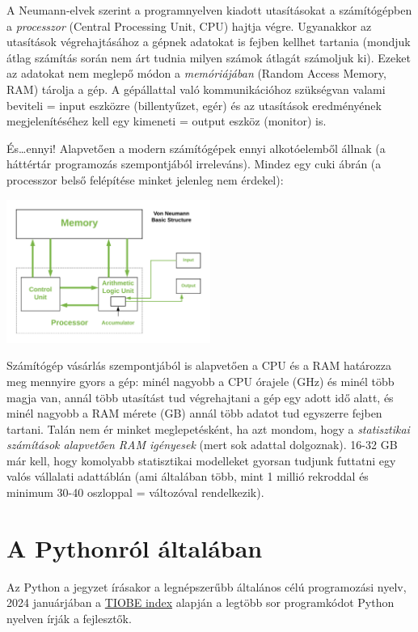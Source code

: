\documentclass[
]{book}
\begin{document}
A Neumann-elvek szerint a programnyelven kiadott utasításokat a számítógépben a \emph{processzor} (Central Processing Unit, CPU) hajtja végre. Ugyanakkor az utasítások végrehajtásához a gépnek adatokat is fejben kellhet tartania (mondjuk átlag számítás során nem árt tudnia milyen számok átlagát számoljuk ki). Ezeket az adatokat nem meglepő módon a \emph{memóriájában} (Random Access Memory, RAM) tárolja a gép.
A gépállattal való kommunikációhoz szükségvan valami beviteli = input eszközre (billentyűzet, egér) és az utasítások eredményének megjelenítéséhez kell egy kimeneti = output eszköz (monitor) is.

És\ldots ennyi! Alapvetően a modern számítógépek ennyi alkotóelemből állnak (a háttértár programozás szempontjából irreleváns).
Mindez egy cuki ábrán (a processzor belső felépítése minket jelenleg nem érdekel):

\includegraphics[width=0.5\textwidth,height=\textheight]{neumann.png}

Számítógép vásárlás szempontjából is alapvetően a CPU és a RAM határozza meg mennyire gyors a gép: minél nagyobb a CPU órajele (GHz) és minél több magja van, annál több utasítást tud végrehajtani a gép egy adott idő alatt, és minél nagyobb a RAM mérete (GB) annál több adatot tud egyszerre fejben tartani.
Talán nem ér minket meglepetésként, ha azt mondom, hogy a \emph{statisztikai számítások alapvetően RAM igényesek} (mert sok adattal dolgoznak). 16-32 GB már kell, hogy komolyabb statisztikai modelleket gyorsan tudjunk futtatni egy valós vállalati adattáblán (ami általában több, mint 1 millió rekroddal és minimum 30-40 oszloppal = változóval rendelkezik).

\section{A Pythonról általában}\label{a-pythonruxf3l-uxe1ltaluxe1ban}

Az Python a jegyzet írásakor a legnépszerűbb általános célú programozási nyelv, 2024 januárjában a \href{https://www.tiobe.com/tiobe-index/}{TIOBE index} alapján a legtöbb sor programkódot Python nyelven írják a fejlesztők.
\end{document}
